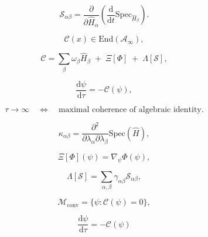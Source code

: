 \[
\mathcal{S}_{\alpha\beta}
=
\frac{\partial}{\partial \hat{H}_\alpha}
\left(
\frac{\mathrm{d}}{\mathrm{d}t}
\mathrm{Spec}_{\hat{H}_\beta}
\right).
\]

\[
\mathcal{C}(x) \in \mathrm{End}(\mathcal{A}_\infty),
\]

\[
\mathcal{C}
=
\sum_{\beta}
\omega_\beta \hat{H}_\beta
\;+\;
\Xi[\Phi]
\;+\;
\Lambda[\mathcal{S}],
\]

\[
\frac{\mathrm{d}\psi}{\mathrm{d}\tau}
=
-\mathcal{C}(\psi),
\]

\[
\tau \to \infty
\quad\Longleftrightarrow\quad
\text{maximal coherence of algebraic identity}.
\]

\[
\kappa_{\alpha\beta}
=
\frac{\partial^2}{\partial \lambda_\alpha \partial \lambda_\beta}
\mathrm{Spec}(\hat{H}),
\]

\[
\Xi[\Phi](\psi)
=
\nabla_{\psi} \Phi(\psi),
\]

\[
\Lambda[\mathcal{S}]
=
\sum_{\alpha,\beta}
\gamma_{\alpha\beta} \mathcal{S}_{\alpha\beta},
\]

\[
\mathcal{M}_{\mathrm{conv}}
=
\{\psi : \mathcal{C}(\psi) = 0\},
\]

\[
\frac{\mathrm{d}\psi}{\mathrm{d}\tau} = -\mathcal{C}(\psi)
\]


